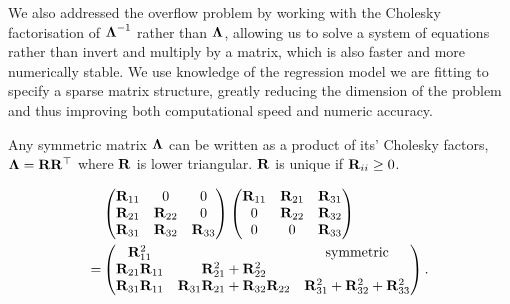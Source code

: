 \documentclass{amsart}[12pt]
\begin{document}
			We also addressed the overflow problem by working with the Cholesky factorisation of ${\boldsymbol \Lambda}^{-1}$
			rather than ${\boldsymbol \Lambda}$, allowing us to solve a system of equations rather than invert and multiply by a
			matrix, which is also faster and more numerically stable. We use knowledge of the regression  model we are
			fitting to specify a sparse matrix structure, greatly reducing the dimension of   the problem and thus
			improving both computational speed and numeric accuracy.
			
				
			Any symmetric matrix ${\boldsymbol \Lambda}$ can be written as a product of its' Cholesky factors, ${\boldsymbol \Lambda} =
			{\bf R} {\bf R}^\top$ where ${\bf R}$ is lower triangular. ${\bf R}$ is unique if ${\bf R}_{ii} \geq 0$.
				
			\begin{align*}
				&\begin{pmatrix}
				{\bf R}_{11}          & 0                                    & 0                                     \\
				{\bf R}_{21}          & {\bf R}_{22}                             & 0                                     \\
				{\bf R}_{31}          & {\bf R}_{32}                             & {\bf R}_{33}                              
				\end{pmatrix}
				\begin{pmatrix}
				{\bf R}_{11}          & {\bf R}_{21}                             & {\bf R}_{31}                              \\
				0                 & {\bf R}_{22}                             & {\bf R}_{32}                              \\
				0                 & 0                                    & {\bf R}_{33}                              
				\end{pmatrix}
				\\
				=& \begin{pmatrix}
				{\bf R}_{11}^2        &                                      & \text{symmetric}                      \\
				{\bf R}_{21}{\bf R}_{11} & {\bf R}_{21}^2 + {\bf R}_{22}^2 \\
				{\bf R}_{31} {\bf R}_{11} & {\bf R}_{31}{\bf R}_{21} + {\bf R}_{32} {\bf R}_{22} & {\bf R}_{31}^2 + {\bf R}_{32} ^2 + {\bf R}_{33}^2 
				\end{pmatrix}.
			\end{align*}
			
\end{document}
